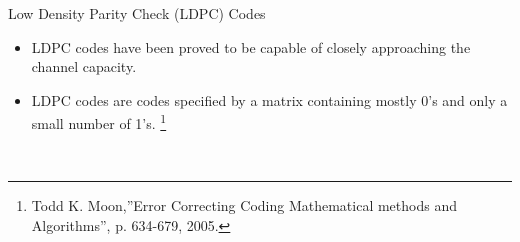 \documentclass[11pt, aspectratio=169]{beamer}
\newcommand\blfootnote[1]{%
  \begingroup
  \renewcommand\thefootnote{}\footnote{#1}%
  \addtocounter{footnote}{-1}%
  \endgroup
}
\begin{document}
\begin{frame}{Low Density Parity Check (LDPC) Codes}
\begin{figure}
\begin{minipage}{.5\linewidth}
			\vspace{-0.5cm}
		\end{minipage}
		\hfill
		\label{gambar: awgnhasil}
	\end{figure}
\vspace{0.5cm}
	\footnotesize{
		\begin{itemize}
			\item LDPC codes have been proved to be capable of closely approaching the channel capacity.\\
			\item LDPC codes are codes specified by a matrix containing mostly 0’s and only a small number of 1’s.
			\blfootnote{\tiny Todd K. Moon,”Error Correcting Coding Mathematical methods and Algorithms”, p. 634-679, 2005.
			} \\
%			

\end{itemize}}
\end{frame}
\end{document}
